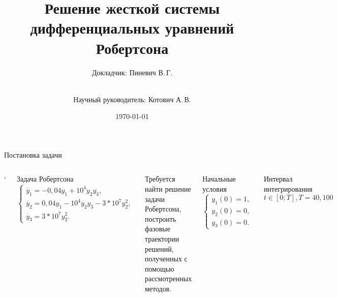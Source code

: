 \documentclass[ignoreonframetext,unicode]{beamer}
\title[Решение задачи Робертсона]{Решение жесткой системы\\ дифференциальных уравнений Робертсона}
\author[Пиневич В.\,Г.]{Докладчик: Пиневич В.\,Г.\and\\[0.5mm] Научный руководитель: Котович А.\,В.}
\institute[каф. Прикладная математика ФН-2]{группа ФН2-61Б}
\date{\today}
\begin{document}
	
	\begin{frame}[plain]
		\maketitle
	\end{frame}

	\begin{frame}{Постановка задачи}
		\begin{columns}
			\column{\textwidth}`
			\begin{block}{Задача Робертсона}
			 \[
				\begin{cases}
					\dot{y_1} = -0,04 y_1 + 10^4 y_2 y_3,\\
					\dot{y_2} = 0,04 y_1 - 10^4 y_2 y_3 - 3 * 10^7 y_2^2,\\
					\dot{y_3} = 3 * 10^7 y_2^2.
				\end{cases}
			 \]
			\end{block}

		\begin{columns}
			Требуется найти решение задачи Робертсона, построить фазовые траектории решений, полученных с помощью рассмотренных методов.
			\begin{block}{Начальные условия}
				\[
				\begin{cases}
					y_1(0) = 1,\\
					y_2(0) = 0,\\
					y_3(0) = 0.
				\end{cases}
				\]
			\end{block}
		\begin{block}{Интервал интегрирования}
		\[
			t \in [0; T], T = 40, 100
		\]
		\end{block}
		\end{columns}

		\end{columns}
		
	\end{frame}
\end{document}
